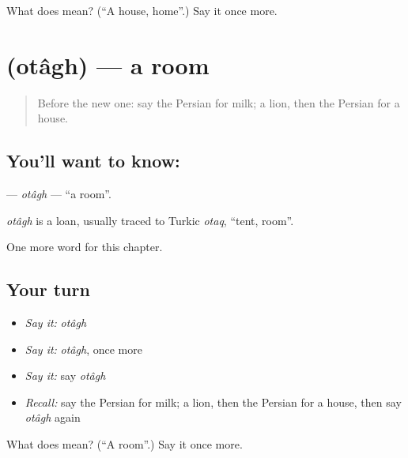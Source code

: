 \begin{tcolorbox}[breakable,colback=teal!4,colframe=teal!35!black,title={Before you move on}]
What does  mean? (\textquotedblleft{}A house, home\textquotedblright{}.) Say it once more.
\end{tcolorbox}
\section[\texorpdfstring{\fa{اتاق} (otâgh)}{اتاق (otâgh)}]{ (otâgh) — a room}

\label{lesson:FA-C45-otagh}



\begin{quote}
Before the new one: say the Persian for milk; a lion, then the Persian for a house.
\end{quote}

\subsection*{You'll want to know: }
\textbf{} — \emph{otâgh} — \textquotedblleft{}a room\textquotedblright{}.

\begin{cousinweb}
\emph{otâgh} is a loan, usually traced to Turkic \emph{otaq}, \textquotedblleft{}tent, room\textquotedblright{}.
\end{cousinweb}

\begin{grammarlens}[title={What you've built}]
One more word for this chapter.
\end{grammarlens}

\subsection*{Your turn}
\begin{itemize}
\raggedright
  \item \emph{Say it:} \emph{otâgh}
  \item \emph{Say it:} \emph{otâgh}, once more
  \item \emph{Say it:} say \emph{otâgh}
  \item \emph{Recall:} say the Persian for milk; a lion, then the Persian for a house, then say \emph{otâgh} again
\end{itemize}

\begin{tcolorbox}[breakable,colback=teal!4,colframe=teal!35!black,title={Before you move on}]
What does  mean? (\textquotedblleft{}A room\textquotedblright{}.) Say it once more.
\end{tcolorbox}
